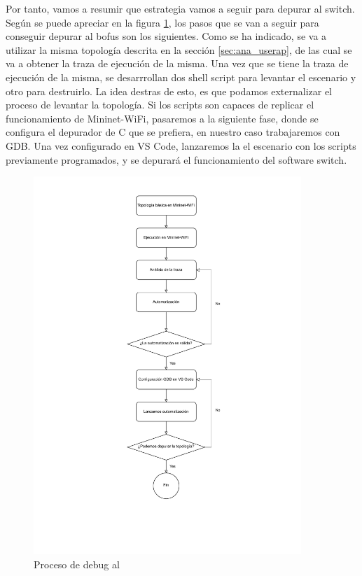 Por tanto, vamos a resumir que estrategia vamos a seguir para depurar al switch. Según se puede apreciar en la figura \ref{fig:debugBOFUSS}, los pasos que se van a seguir para conseguir depurar al \gls{bofus} son los siguientes. Como se ha indicado, se va a utilizar la misma topología descrita en la sección \ref{sec:ana_userap}, de las cual se va a obtener la traza de ejecución de la misma. Una vez que se tiene la traza de ejecución de la misma, se desarrrollan dos shell script para levantar el escenario y otro para destruirlo. La idea destras de esto, es que podamos externalizar el proceso de levantar la topología. Si los scripts son capaces de replicar el funcionamiento de Mininet-WiFi, pasaremos a la siguiente fase, donde se configura el depurador de C que se prefiera, en nuestro caso trabajaremos con GDB. Una vez configurado en VS Code, lanzaremos la el escenario con los scripts previamente programados, y se depurará el funcionamiento del software switch.

\newpage

\begin{figure}[ht!]
    \centering
    \includegraphics[width=0.9\textwidth]{archivos/img/analisis/debugBOFUSS.drawio.pdf}
    \caption{Proceso de debug al }
    \label{fig:debugBOFUSS}
\end{figure}

